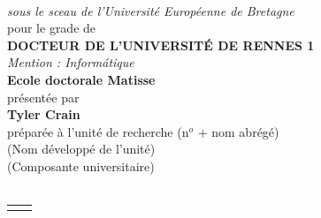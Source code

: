 \begin{titlepage}
\begin{center}
\begin{minipage}{\glarg}
\vspace{0.5cm}
\\ \vspace{0mm}\emph{\Large sous le sceau de l'Universit\'e Europ\'eenne de Bretagne}\\ \vspace{0.5cm}
{\Large pour le grade de}\\ \vspace{2mm}
{\Large\bf DOCTEUR DE L'UNIVERSIT\'E DE RENNES 1}\\ \vspace{0.4cm}
\emph{\Large Mention : Inform{\'a}tique}\\ \vspace{2mm}
{\Large\bf Ecole doctorale Matisse}\\ \vspace{0.3cm}
{\Large pr\'esent\'ee par} \\ \vspace{3mm}
{\Huge\bf Tyler Crain}\\ \vspace{0.4cm}
{\Large pr\'epar\'ee \`a l'unit\'e de recherche (n$^o$ + nom abr\'eg\'e)\\
(Nom d\'evelopp\'e de l'unit\'e)\\
(Composante universitaire)}\vspace{0.3cm}
\\
\hspace{-20mm}{\rule{\Glarg}{1pt}}\\
\vspace{8mm}

\begin{tabular}{p{7cm}p{10cm}}
\begin{minipage}{\plarg}

\hspace{-1.8cm}{\huge\bf On Improving the}\vspace{5mm}

\hspace{-1.8cm}{\huge\bf  Ease of Use of the}\vspace{5mm}

\hspace{-1.8cm}{\huge\bf Software Transactional}\vspace{5mm}


\end{minipage}
\end{tabular}
\end{minipage}
\end{center}
\end{titlepage}
